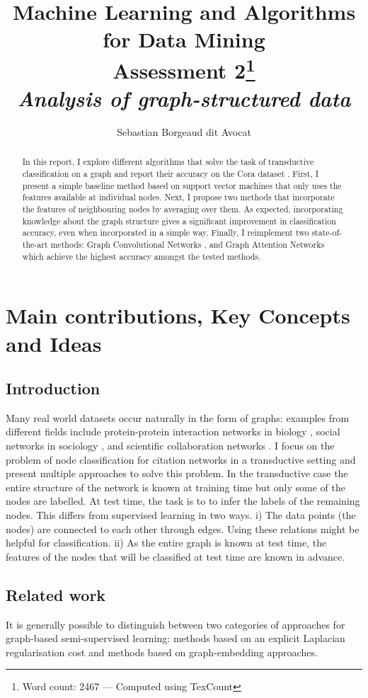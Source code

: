 \documentclass[12pt]{article}
\title{{\small{Machine Learning and Algorithms for Data Mining} \\
Assessment 2\footnote{Word count: 2467 --- Computed using TexCount}} \\
\textit{Analysis of graph-structured data}}
\author{Sebastian Borgeaud dit Avocat}
\theoremstyle{definition}
\begin{document}
\maketitle

\begin{abstract}
	In this report, I explore different algorithms that solve the task of transductive classification on a graph and report their accuracy on the Cora dataset \cite{cora}. First, I present a simple baseline method based on support vector machines that only uses the features available at individual nodes. Next, I propose two methods that incorporate the features of neighbouring nodes by averaging over them. As expected, incorporating knowledge about the graph structure gives a significant improvement in classification accuracy, even when incorporated in a simple way. Finally, I reimplement two state-of-the-art methods: Graph Convolutional Networks \cite{kipf2017semi}, and Graph Attention Networks \cite{velickovic2018graph} which achieve the highest accuracy amongst the tested methods.
\end{abstract}

\section{Main contributions, Key Concepts and Ideas}
\subsection{Introduction}
Many real world datasets occur naturally in the form of graphs: examples from different fields include protein-protein interaction networks in biology \cite{schwikowski2000network}, social networks in sociology \cite{otte2002social}, and scientific collaboration networks \cite{newman2001structure}. I focus on the problem of node classification for citation networks in a transductive setting and present multiple approaches to solve this problem. In the transductive case the entire structure of the network is known at training time but only some of the nodes are labelled. At test time, the task is to to infer the labels of the remaining nodes. This differs from supervised learning in two ways. i) The data points (the nodes) are connected to each other through edges. Using these relations might be helpful for classification. ii) As the entire graph is known at test time, the features of the nodes that will be classified at test time are known in advance. 

\subsection{Related work}
It is generally possible to distinguish between two categories of approaches for graph-based semi-supervised learning: methods based on an explicit Laplacian regularisation cost and methods based on graph-embedding approaches.
\end{document}
